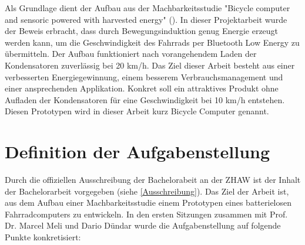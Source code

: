 Als Grundlage dient der Aufbau aus der Machbarkeitsstudie "Bicycle computer and sensoric powered with harvested energy" (\cite{PA_bicycle}). In dieser Projektarbeit wurde der Beweis erbracht, dass durch Bewegungsinduktion genug Energie erzeugt werden kann, um die Geschwindigkeit des Fahrrads per Bluetooth Low Energy zu übermitteln. Der Aufbau funktioniert nach vorangehendem Laden der Kondensatoren zuverlässig bei 20 km/h. Das Ziel dieser Arbeit besteht aus einer verbesserten Energiegewinnung, einem besserem Verbrauchsmanagement und einer ansprechenden Applikation. Konkret soll ein attraktives Produkt ohne Aufladen der Kondensatoren für eine Geschwindigkeit bei 10 km/h entstehen. Diesen Prototypen wird in dieser Arbeit kurz Bicycle Computer genannt.






\section{Definition der Aufgabenstellung}\label{Aufgabenstellung} 

Durch die offiziellen Ausschreibung der Bachelorabeit an der ZHAW ist der Inhalt der Bachelorarbeit vorgegeben (siehe \ref{Ausschreibung}). Das Ziel der Arbeit ist, aus dem Aufbau einer Machbarkeitsstudie einem Prototypen eines batterielosen Fahrradcomputers zu entwickeln. In den ersten Sitzungen zusammen mit Prof. Dr. Marcel Meli und Dario Dündar wurde die Aufgabenstellung auf folgende Punkte konkretisiert:\\ 

